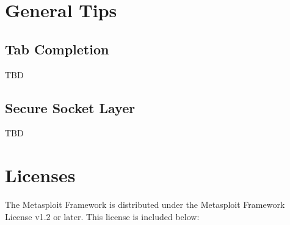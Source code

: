 \documentclass{report}
\begin{document}
\pagebreak
\chapter{General Tips}

	\section{Tab Completion}
	\label{REF-TAB}
\par
TBD
	\section{Secure Socket Layer}
	\label{REF-SSL}
\par
TBD

\pagebreak
\chapter{Licenses}

\par
The Metasploit Framework is distributed under the Metasploit Framework License
v1.2 or later.  This license is included below:
\end{document}
